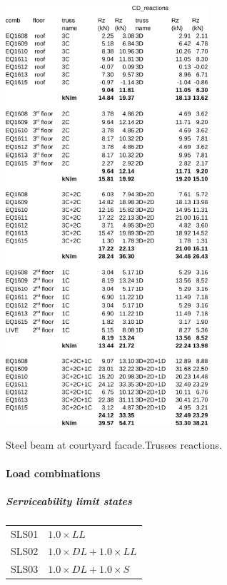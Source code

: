 \begin{table}
  \begin{center}
  \includegraphics[width=75mm]{figures/CD_reactions}
  \end{center}
  \caption{Steel beam at courtyard facade.Trusses reactions.}\label{tb_CD_reactions}
\end{table}

\paragraph{Load combinations}

\subparagraph{Serviceability limit states}
\begin{center}
  \begin{tabular}{|l|l|}
    \hline
    SLS01 & $1.0 \times LL$ \\
    SLS02 & $1.0 \times DL+1.0 \times LL$ \\
    SLS03 & $1.0 \times DL+1.0 \times S$ \\
    \hline
  \end{tabular}
  \end{center}


